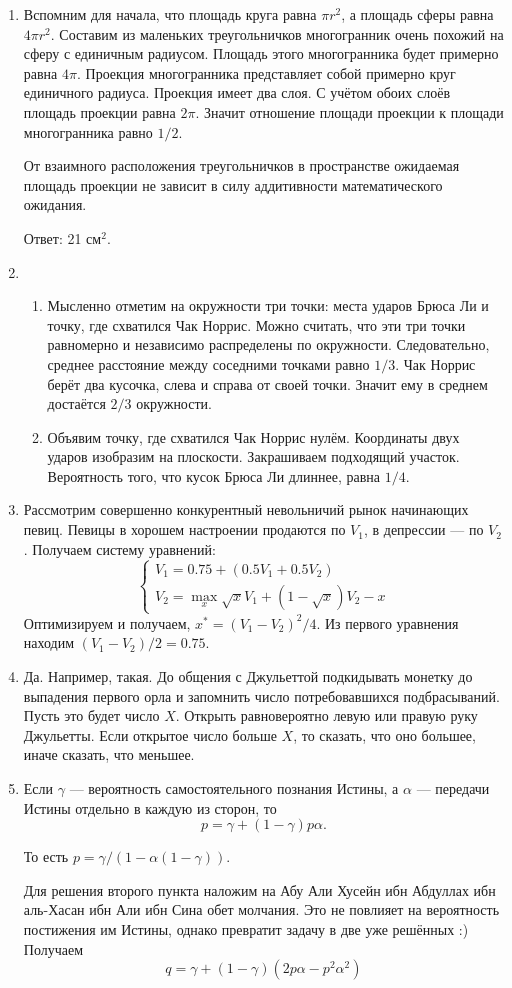 \begin{enumerate}
\item Вспомним для начала, что площадь круга равна $\pi r^2$, а площадь сферы равна
$4\pi r^2$. Составим из маленьких треугольничков многогранник очень похожий на сферу
с единичным радиусом. Площадь этого многогранника будет примерно равна $4\pi$.
Проекция многогранника представляет собой примерно круг единичного радиуса.
Проекция имеет два слоя. С учётом обоих слоёв площадь проекции равна $2\pi$.
Значит отношение площади проекции к площади многогранника равно $1/2$.

От взаимного расположения треугольничков в пространстве ожидаемая площадь
проекции не зависит в силу аддитивности математического ожидания.

Ответ: 21 см$^2$.

\item
\begin{enumerate}
\item Мысленно отметим на окружности три точки: места ударов Брюса Ли и точку,
где схватился Чак Норрис. Можно считать, что эти три точки равномерно и независимо
распределены по окружности. Следовательно, среднее расстояние между соседними
точками равно $1/3$. Чак Норрис берёт два кусочка, слева и справа от своей точки.
Значит ему в среднем достаётся $2/3$ окружности.
\item Объявим точку, где схватился Чак Норрис нулём. Координаты двух ударов
изобразим на плоскости. Закрашиваем подходящий участок. Вероятность того, что
кусок Брюса Ли длиннее, равна $1/4$.
\end{enumerate}

\item  Рассмотрим совершенно конкурентный невольничий рынок начинающих певиц.
Певицы в хорошем настроении продаются по $V_1$, в депрессии — по $V_2$.
Получаем систему уравнений:
\[
\begin{cases}
  V_1 = 0.75 + (0.5 V_1 + 0.5 V_2) \\
  V_2 = \max_x \sqrt{x}V_1 + (1 - \sqrt{x})V_2 - x
\end{cases}
\]
Оптимизируем и получаем, $x^* = (V_1 - V_2)^2/4$. Из первого уравнения находим
$(V_1 - V_2)/2=0.75$.

\item Да. Например, такая. До общения с Джульеттой подкидывать монетку до выпадения
первого орла и запомнить число потребовавшихся подбрасываний. Пусть это будет число $X$.
Открыть равновероятно левую или правую руку Джульетты. Если открытое число больше $X$,
то сказать, что оно большее, иначе сказать, что меньшее.
\item Если $\gamma$ — вероятность самостоятельного познания Истины, а $\alpha$ —
передачи Истины отдельно в каждую из сторон, то
\[
p = \gamma + (1-\gamma) p \alpha.
\]

То есть $p=\gamma/(1-\alpha(1-\gamma))$.

Для решения второго пункта наложим на Абу Али Хусейн ибн Абдуллах ибн аль-Хасан
ибн Али ибн Сина обет молчания. Это не повлияет на вероятность постижения им Истины,
однако превратит задачу в две уже решённых :) Получаем
\[
q = \gamma + (1-\gamma)(2p\alpha - p^2\alpha^2)
\]
\end{enumerate}




